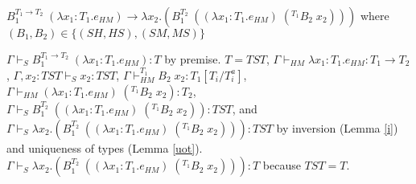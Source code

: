 \begin{case}
$B_{1}^{T_{1}\rightarrow T_{2}}\;(\lambda x_{1}:T_{1}.e_{HM})\rightarrow\lambda x_{2}.(B_{1}^{T_{2}}\;((\lambda x_{1}:T_{1}.e_{HM})\;(^{T_{1}}B_{2}\;x_{2})))$ where $(B_{1},B_{2})\in\lbrace(SH,HS),(SM,MS)\rbrace$

$\Gamma\vdash_{S}B_{1}^{T_{1}\rightarrow T_{2}}\;(\lambda x_{1}:T_{1}.e_{HM}):T$ by premise.  $T=TST$, $\Gamma\vdash_{HM}\lambda x_{1}:T_{1}.e_{HM}:T_{1}\rightarrow T_{2}$, $\Gamma,x_{2}:TST\vdash_{S}x_{2}:TST$, $\Gamma\vdash_{HM}^{T_{1}}B_{2}\;x_{2}:T_{1}[T_{i}/T_{i}^{a}]$, $\Gamma\vdash_{HM}(\lambda x_{1}:T_{1}.e_{HM})\;(^{T_{1}}B_{2}\;x_{2}):T_{2}$, $\Gamma\vdash_{S}B_{1}^{T_{2}}\;((\lambda x_{1}:T_{1}.e_{HM})\;(^{T_{1}}B_{2}\;x_{2})):TST$, and $\Gamma\vdash_{S}\lambda x_{2}.(B_{1}^{T_{2}}\;((\lambda x_{1}:T_{1}.e_{HM})\;(^{T_{1}}B_{2}\;x_{2}))):TST$ by inversion (Lemma \ref{i}) and uniqueness of types (Lemma \ref{uot}).  $\Gamma\vdash_{S}\lambda x_{2}.(B_{1}^{T_{2}}\;((\lambda x_{1}:T_{1}.e_{HM})\;(^{T_{1}}B_{2}\;x_{2}))):T$ because $TST=T$.
\end{case}